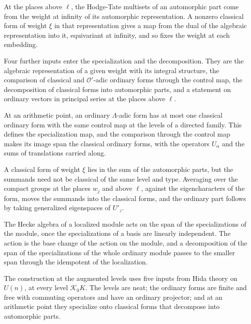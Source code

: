 At the places above $\ell$, the Hodge-Tate multisets of an automorphic part come from the weight at infinity of its automorphic representation. A nonzero classical form of weight $\xi$ in that representation gives a map from the dual of the algebraic representation into it, equivariant at infinity, and so fixes the weight at each embedding.

Four further inputs enter the specialization and the decomposition. They are the algebraic representation of a given weight with its integral structure, the comparison of classical and $\mathcal O'$-adic ordinary forms through the control map, the decomposition of classical forms into automorphic parts, and a statement on ordinary vectors in principal series at the places above $\ell$.

At an arithmetic point, an ordinary $\Lambda$-adic form has at most one classical ordinary form with the same control map at the levels of a directed family. This defines the specialization map, and the comparison through the control map makes its image span the classical ordinary forms, with the operators $U_\alpha$ and the sums of translations carried along.

A classical form of weight $\xi$ lies in the sum of the automorphic parts, but the summands need not be classical of the same level and type. Averaging over the compact groups at the places $w_j$ and above $\ell$, against the eigencharacters of the form, moves the summands into the classical forms, and the ordinary part follows by taking generalized eigenspaces of $U'_z$.

The Hecke algebra of a localized module acts on the span of the specializations of the module, once the specializations of a basis are linearly independent. The action is the base change of the action on the module, and a decomposition of the span of the specializations of the whole ordinary module passes to the smaller span through the idempotent of the localization.

The construction at the augmented levels uses five inputs from Hida theory on $U(n)$, at every level $\mathcal K_0K$. The levels are neat; the ordinary forms are finite and free with commuting operators and have an ordinary projector; and at an arithmetic point they specialize onto classical forms that decompose into automorphic parts.

